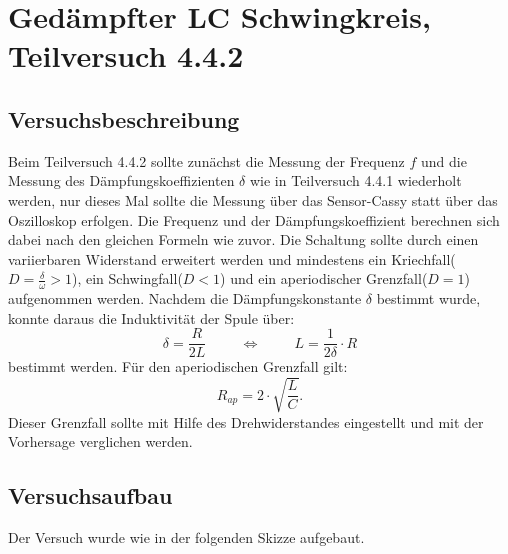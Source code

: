\documentclass[12pt,a4paper]{article}
\author{Gruppe C14 \\ Julián Häck, Martin Koytek, Lars Wenning, Erik Zimmermann}
\begin{document}
\section{Gedämpfter LC Schwingkreis, Teilversuch 4.4.2}
\subsection{Versuchsbeschreibung}

Beim Teilversuch 4.4.2 sollte zunächst die Messung der Frequenz $f$ und die Messung des Dämpfungskoeffizienten $\delta$ wie in Teilversuch 4.4.1 wiederholt werden, nur dieses Mal sollte die Messung über das Sensor-Cassy statt über das Oszilloskop erfolgen.
Die Frequenz und der Dämpfungskoeffizient berechnen sich dabei nach den gleichen Formeln wie zuvor.
Die Schaltung sollte durch einen variierbaren Widerstand erweitert werden und mindestens ein Kriechfall($D=\frac{\delta}{\omega}>1$), ein Schwingfall($D<1$) und ein aperiodischer Grenzfall($D=1$) aufgenommen werden.
\newline
Nachdem die Dämpfungskonstante $\delta$ bestimmt wurde, konnte daraus die Induktivität der Spule über:
\begin{equation}
\delta =\frac{R}{2L} \hspace{1cm}
\Leftrightarrow  \hspace{1cm} L=\frac{1}{2\delta}\cdot R \label{Spule}
\end{equation}
bestimmt werden.
\newline
Für den aperiodischen Grenzfall gilt:
\begin{equation}
R_{ap}=2\cdot\sqrt{\frac{L}{C}}.
\label{aperiodischer GF}
\end{equation}
Dieser Grenzfall sollte mit Hilfe des Drehwiderstandes eingestellt und mit der Vorhersage verglichen werden.
\subsection{Versuchsaufbau}

Der Versuch wurde wie in der folgenden Skizze aufgebaut.
\end{document}
